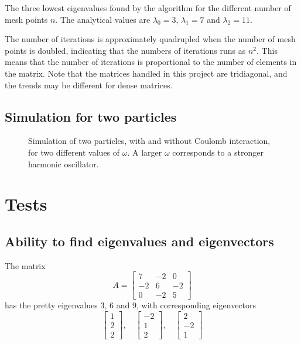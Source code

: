 \documentclass[12pt,english,a4paper]{report}
\begin{document}
\begin{table}[H]
\[

\]
\caption{The three lowest eigenvalues found by the algorithm for the different number of mesh points \(n\). The analytical values are \(\lambda_0=3\), \(\lambda_1=7\) and \(\lambda_2=11\).}
\end{table}
The number of iterations is approximately quadrupled when the number of mesh points is doubled, indicating that the numbers of iterations runs as \(n^2\). This means that the number of iterations is proportional to the number of elements in the matrix. Note that the matrices handled in this project are tridiagonal, and the trends may be different for dense matrices.


\subsection{Simulation for two particles}
\begin{figure}[H]
\centering

\caption{Simulation of two particles, with and without Coulomb interaction, for two different values of \(\omega\). A larger \(\omega\) corresponds to a stronger harmonic oscillator.}
\end{figure}


\section{Tests}
\subsection{Ability to find eigenvalues and eigenvectors}
The matrix
\[
A = \begin{bmatrix}7 & -2 & 0\\ -2 & 6 & -2\\ 0 & -2 & 5\end{bmatrix}
\]
has the pretty eigenvalues \(3\), \(6\) and \(9\), with corresponding eigenvectors
\[
\begin{bmatrix}1 \\ 2 \\ 2\end{bmatrix},\quad
\begin{bmatrix}-2 \\ 1 \\ 2\end{bmatrix}, \quad
\begin{bmatrix}2 \\ -2 \\ 1\end{bmatrix}
\]
\end{document}
